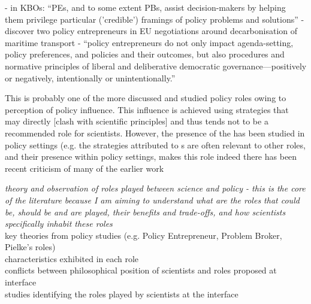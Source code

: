 \cite{MacKillopCDD2023} - in KBOs: ``PEs, and to some extent PBs, assist decision-makers by helping them privilege particular ('credible') framings of policy problems and solutions''
\cite{vonMalmborg2024transport} - discover two policy entrepreneurs in EU negotiations around decarbonisation of maritime transport
\cite{vonMalmborg2024strategies} - ``policy entrepreneurs do not only impact agenda-setting, policy preferences, and policies and their outcomes, but also procedures and normative principles of liberal and deliberative democratic governance---positively or negatively, intentionally or unintentionally.''

This is probably one of the more discussed and studied policy roles owing to perception of policy influence. This influence is achieved using strategies that may directly [clash with scientific principles] and thus tends not to be a recommended role for scientists. However, the presence of the \PE has been studied in \CAN policy settings (e.g. \cite{MintromL2017,CarterC2018}  the strategies attributed to \PE s are often relevant to other \SPI roles, and their presence within policy settings, makes this role   indeed there has been recent criticism of many of the earlier work

\emph{theory and observation of roles played between science and policy - this is the core of the literature because I am aiming to understand what are the roles that could be, should be and are played, their benefits and trade-offs, and how scientists specifically inhabit these roles}\\
key theories from policy studies (e.g. Policy Entrepreneur, Problem Broker, Pielke’s roles)\\
characteristics exhibited in each role\\
conflicts between philosophical position of scientists and roles proposed at interface\\
studies identifying the roles played by scientists at the interface

